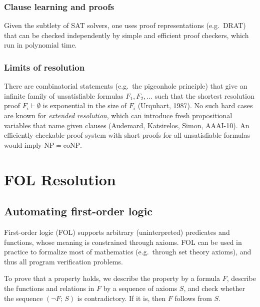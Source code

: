 \subsubsection*{Clause learning and proofs}
 
 
Given the subtlety of SAT solvers, one uses proof representations (e.g.\ DRAT) that can be checked independently by simple and efficient proof checkers, which run in polynomial time.
 
\subsubsection*{Limits of resolution}
 
There are combinatorial statements (e.g.\ the pigeonhole principle) that give an infinite family of unsatisfiable formulas $F_1, F_2, \ldots$ such that the shortest resolution proof $F_i \vdash \emptyset$ is exponential in the size of $F_i$ (Urquhart, 1987). No such hard cases are known for \emph{extended resolution}, which can introduce fresh propositional variables that name given clauses (Audemard, Katsirelos, Simon, AAAI-10). An efficiently checkable proof system with short proofs for all unsatisfiable formulas would imply $\mathrm{NP} = \mathrm{coNP}$.


\section{FOL Resolution}
 
\subsection*{Automating first-order logic}
 
First-order logic (FOL) supports arbitrary (uninterpreted) predicates and functions, whose meaning is constrained through axioms. FOL can be used in practice to formalize most of mathematics (e.g.\ through set theory axioms), and thus all program verification problems.
 
To prove that a property holds, we describe the property by a formula $F$, describe the functions and relations in $F$ by a sequence of axioms $S$, and check whether the sequence $(\neg F;\, S)$ is contradictory. If it is, then $F$ follows from $S$.
 
